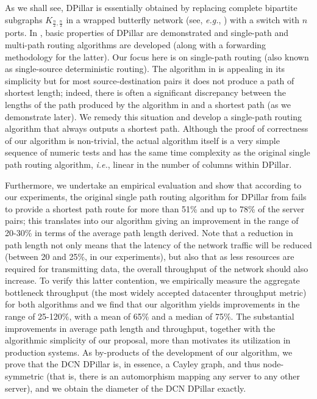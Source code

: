 \documentclass{article}
\begin{document}
As we shall see, DPillar is essentially obtained by replacing complete bipartite subgraphs $K_{\frac{n}{2},\frac{n}{2}}$ in a wrapped butterfly network (see, \emph{e.g.}, \cite{Lei92}) with a switch with $n$ ports. In \cite{LYY12}, basic properties of DPillar are demonstrated and single-path and multi-path routing algorithms are developed (along with a forwarding methodology for the latter). Our focus here is on single-path routing (also known as single-source deterministic routing). The algorithm in \cite{LYY12} is appealing in its simplicity but for most source-destination pairs it does not produce a path of shortest length; indeed, there is often a significant discrepancy between the lengths of the path produced by the algorithm in \cite{LYY12} and a shortest path (as we demonstrate later). We remedy this situation and develop a single-path routing algorithm that always outputs a shortest path. Although the proof of correctness of our algorithm is non-trivial, the actual algorithm itself is a very simple sequence of numeric tests and has the same time complexity as the original single path routing algorithm, \emph{i.e.}, linear in the number of columns within DPillar. 


Furthermore, we undertake an empirical evaluation and show that according to our experiments, the original single path routing algorithm for DPillar from \cite{LYY12} fails to provide a shortest path route for more than 51\% and up to 78\% of the server pairs; this translates into our algorithm giving an improvement in the range of 20-30\% in terms of the average path length derived. Note that a reduction in path length not only means that the latency of the network traffic will be reduced (between 20 and 25\%, in our experiments), but also that as less resources are required for transmitting data, the overall throughput of the network should also increase. To verify this latter contention, we empirically measure the aggregate bottleneck throughput (the most widely accepted datacenter throughput metric) for both algorithms and we find that our algorithm yields improvements in the range of 25-120\%, with a mean of 65\% and a median of 75\%. The substantial improvements in average path length and throughput, together with the algorithmic simplicity of our proposal, more than motivates its utilization in production systems. As by-products of the development of our algorithm, we prove that the DCN DPillar is, in essence, a Cayley graph, and thus node-symmetric (that is, there is an automorphism mapping any server to any other server), and we obtain the diameter of the DCN DPillar exactly. 
\end{document}
